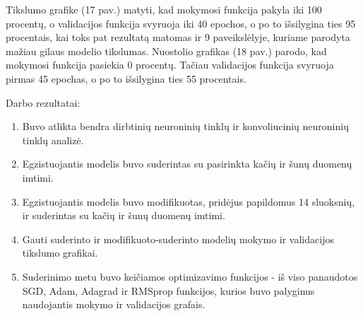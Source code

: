 \documentclass{VUMIFPSkursinis}
\begin{document}
Tikslumo grafike (17 pav.) matyti, kad mokymosi funkcija pakyla iki 100 procentų, o validacijos funkcija svyruoja iki 40 epochos, o po to išsilygina ties 95 procentais, kai toks pat rezultatą matomas ir 9 paveikslėlyje, kuriame parodyta mažiau gilaus modelio tikslumas.
Nuostolio grafikas (18 pav.) parodo, kad mokymosi funkcija pasiekia 0 procentų. Tačiau validacijos funkcija svyruoja pirmas 45 epochas, o po to išsilygina ties 55 procentais.

Darbo rezultatai:
\begin{enumerate}
\item Buvo atlikta bendra dirbtinių neuroninių tinklų ir konvoliucinių neuroninių tinklų analizė.
\item Egzistuojantis modelis buvo suderintas su pasirinkta kačių ir šunų duomenų imtimi.
\item Egzistuojantis modelis buvo modifikuotas, pridėjus papildomus 14 sluoksnių, ir suderintas su kačių ir šunų duomenų imtimi.
\item Gauti suderinto ir modifikuoto-suderinto modelių mokymo ir validacijos tikslumo grafikai.
\item Suderinimo metu buvo keičiamos optimizavimo funkcijos - iš viso panaudotos SGD, Adam, Adagrad ir RMSprop funkcijos, kurios buvo palyginus naudojantis mokymo ir validacijos grafais.
\end{enumerate}

\hfill\break
\end{document}
